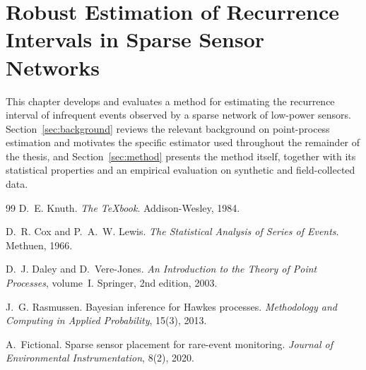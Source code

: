 \documentclass[11pt,a4paper]{report}
\begin{document}
\chapter{Robust Estimation of Recurrence Intervals in Sparse Sensor Networks}
\label{ch:robust}

This chapter develops and evaluates a method for estimating the recurrence
interval of infrequent events observed by a sparse network of low-power
sensors. Section~\ref{sec:background} reviews the relevant background on
point-process estimation and motivates the specific estimator used
throughout the remainder of the thesis, and Section~\ref{sec:method}
presents the method itself, together with its statistical properties and an
empirical evaluation on synthetic and field-collected data.





\begin{thebibliography}{99}
D.~E. Knuth.
\newblock \emph{The \TeX book}.
\newblock Addison-Wesley, 1984.

D.~R. Cox and P.~A.~W. Lewis.
\newblock \emph{The Statistical Analysis of Series of Events}.
\newblock Methuen, 1966.

D.~J. Daley and D.~Vere-Jones.
\newblock \emph{An Introduction to the Theory of Point Processes}, volume~I.
\newblock Springer, 2nd edition, 2003.

J.~G. Rasmussen.
\newblock Bayesian inference for {H}awkes processes.
\newblock \emph{Methodology and Computing in Applied Probability}, 15(3), 2013.

A.~Fictional.
\newblock Sparse sensor placement for rare-event monitoring.
\newblock \emph{Journal of Environmental Instrumentation}, 8(2), 2020.
\end{thebibliography}
\end{document}

